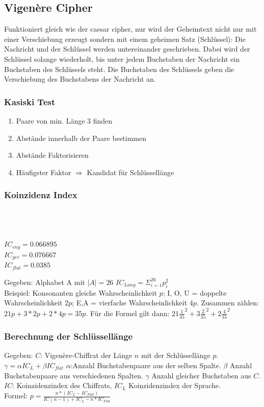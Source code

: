 \documentclass[landscape,twocolumn,a4paper]{article}
\begin{document}
\subsection{Vigenère Cipher}
Funktioniert gleich wie der caesar cipher, nur wird der Geheimtext nicht nur mit einer Verschiebung erzeugt sondern mit einem geheimen Satz (Schlüssel): Die Nachricht und der Schlüssel werden untereinander geschrieben. Dabei wird der Schlüssel solange wiederholt, bis unter jedem Buchstaben der Nachricht ein Buchstaben des Schlüssels steht. Die Buchstaben des Schlüssels geben die Verschiebung des Buchstabens der Nachricht an.
\subsubsection{Kasiski Test}
\begin{multicols}{2}
\begin{enumerate}
\item Paare von min. Länge 3 finden
\item Abstände innerhalb der Paare bestimmen
\item Abstände Faktorisieren
\item Häufigster Faktor $\Rightarrow$ Kandidat für Schlüssellänge
\end{enumerate}
\end{multicols}
\subsubsection{Koinzidenz Index}
\begin{multicols}{2}
 \\ \\
 \\
$IC_{eng} = 0.066895$\\
$IC_{ger} = 0.076667$\\
$IC_{flat}=0.0385$\\
\end{multicols}
Gegeben: Alphabet A mit $|A|=26$ $IC_{Lang} = \Sigma_{i=1}^{26} p_i^2$ \\
Beispiel: Konsonanten gleiche Wahrscheinlichkeit $p$; I, O, U = doppelte Wahrscheinlichkeit $2p$; E,A = vierfache Wahrscheinlichkeit $4p$. Zusammen zählen: $21p + 3*2p + 2*4p = 35p$. Für die Formel gilt dann: $21\frac{1}{35}^2 + 3\frac{2}{35}^2 + 2\frac{4}{35}^2$
\subsubsection{Berechnung der Schlüssellänge}
Gegeben: $C$: Vigenère-Chiffrat der Länge $n$ mit der Schlüssellänge $p$.
$\gamma = \alpha IC_L + \beta IC_{flat}$ $\alpha$:Anzahl Buchstabenpaare aus der selben Spalte. $\beta$ Anzahl Buchstabenpaare aus verschiedenen Spalten. $\gamma$ Anzahl gleicher Buchstaben aus $C$. $IC$: Koinzidenzindex des Chiffrats, $IC_L$ Koinzidenzindex der Sprache.\\
Formel: $p = \frac{n * (IC_L - IC_{Flat})}{IC(n-1) + IC_L - n*IC_{Flat}}$
\end{document}
